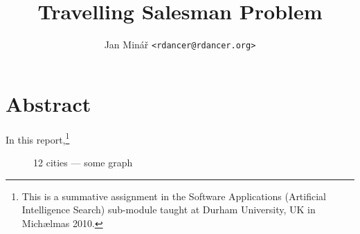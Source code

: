 \documentclass[10pt,twocolumn]{article}
\author{Jan Minář {\tt <rdancer@rdancer.org>}}
\title{Travelling Salesman Problem}
\begin{document}

\setcounter{section}{-1}  %

\maketitle



\section{Abstract}
\thispagestyle{fancy}

In this report,\footnote{This is a summative assignment in the Software Applications (Artificial Intelligence Search) sub-module taught at Durham University, UK in Michælmas 2010.}

\begin{figure}


    \caption{
	12 cities --- some graph
    }
    \label{file012}
\end{figure}



\pagebreak

\nocite{*}  %


\thispagestyle{fancy}
\end{document}
